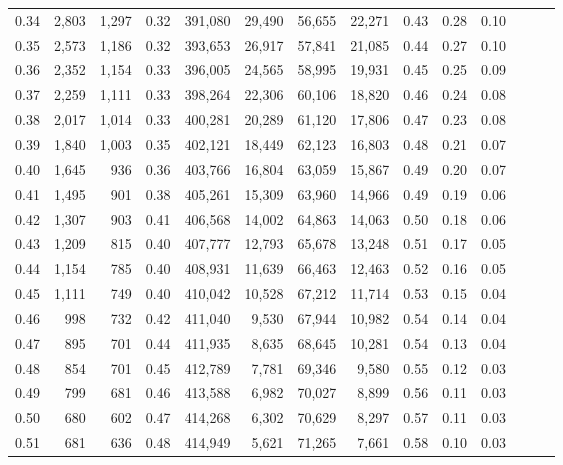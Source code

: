 \begin{tabular}{rrrrrrrrrrrrrr}
0.34 &   2,803 &  1,297 &  0.32 &  391,080 &   29,490 &  56,655 &  22,271 &  0.43 &  0.28 &      0.10 \\
0.35 &   2,573 &  1,186 &  0.32 &  393,653 &   26,917 &  57,841 &  21,085 &  0.44 &  0.27 &      0.10 \\
0.36 &   2,352 &  1,154 &  0.33 &  396,005 &   24,565 &  58,995 &  19,931 &  0.45 &  0.25 &      0.09 \\
0.37 &   2,259 &  1,111 &  0.33 &  398,264 &   22,306 &  60,106 &  18,820 &  0.46 &  0.24 &      0.08 \\
0.38 &   2,017 &  1,014 &  0.33 &  400,281 &   20,289 &  61,120 &  17,806 &  0.47 &  0.23 &      0.08 \\
0.39 &   1,840 &  1,003 &  0.35 &  402,121 &   18,449 &  62,123 &  16,803 &  0.48 &  0.21 &      0.07 \\
0.40 &   1,645 &    936 &  0.36 &  403,766 &   16,804 &  63,059 &  15,867 &  0.49 &  0.20 &      0.07 \\
0.41 &   1,495 &    901 &  0.38 &  405,261 &   15,309 &  63,960 &  14,966 &  0.49 &  0.19 &      0.06 \\
0.42 &   1,307 &    903 &  0.41 &  406,568 &   14,002 &  64,863 &  14,063 &  0.50 &  0.18 &      0.06 \\
0.43 &   1,209 &    815 &  0.40 &  407,777 &   12,793 &  65,678 &  13,248 &  0.51 &  0.17 &      0.05 \\
0.44 &   1,154 &    785 &  0.40 &  408,931 &   11,639 &  66,463 &  12,463 &  0.52 &  0.16 &      0.05 \\
0.45 &   1,111 &    749 &  0.40 &  410,042 &   10,528 &  67,212 &  11,714 &  0.53 &  0.15 &      0.04 \\
0.46 &     998 &    732 &  0.42 &  411,040 &    9,530 &  67,944 &  10,982 &  0.54 &  0.14 &      0.04 \\
0.47 &     895 &    701 &  0.44 &  411,935 &    8,635 &  68,645 &  10,281 &  0.54 &  0.13 &      0.04 \\
0.48 &     854 &    701 &  0.45 &  412,789 &    7,781 &  69,346 &   9,580 &  0.55 &  0.12 &      0.03 \\
0.49 &     799 &    681 &  0.46 &  413,588 &    6,982 &  70,027 &   8,899 &  0.56 &  0.11 &      0.03 \\
0.50 &     680 &    602 &  0.47 &  414,268 &    6,302 &  70,629 &   8,297 &  0.57 &  0.11 &      0.03 \\
0.51 &     681 &    636 &  0.48 &  414,949 &    5,621 &  71,265 &   7,661 &  0.58 &  0.10 &      0.03 \\

\end{tabular}

